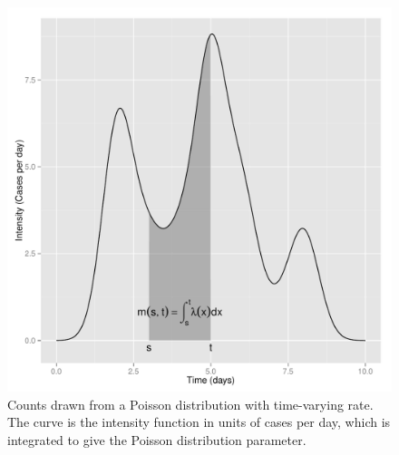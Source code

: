 \begin{knitrout}
\color{fgcolor}\begin{kframe}
\begin{alltt}
\hlstd{(} \hlstd{=}\hlstd{))}
\end{alltt}
\end{kframe}
\end{knitrout}

\begin{knitrout}
\color{fgcolor}\begin{kframe}
\begin{alltt}
 \hlkwb{<-} \hlstd{(}\hlstd{=} \hlstd{))}
\end{alltt}
\end{kframe}\begin{figure}[]

\includegraphics[width=\maxwidth]{figure/print-cont-inhomo} \caption[Counts drawn from a Poisson distribution with time-varying rate]{Counts drawn from a Poisson distribution with time-varying rate.  The curve is the intensity function in units of cases per day, which is integrated to give the Poisson distribution parameter.\label{fig:print-cont-inhomo}}
\end{figure}


\end{knitrout}

